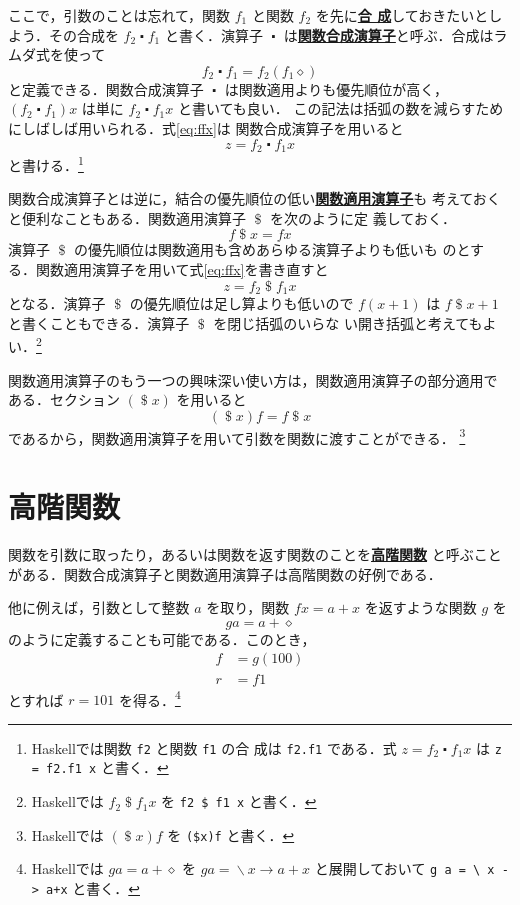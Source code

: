 \documentclass[a5paper,twoside,fleqn]{jsbook}
\newcommand{\programminglanguage}[1]{\textsf{#1}}
\newcommand{\haskell}{\programminglanguage{Haskell}}
\newcommand{\keyword}[1]{{\underline{\textbf{#1}}}}
\newcommand{\code}[1]{\texttt{#1}}
\newcommand{\mAnonParam}{\diamond}
\DeclareMathOperator{\mApply}{\$}
\DeclareMathOperator{\mComp}{\centerdot}
\DeclareMathOperator{\mLambda}{\backslash}
\DeclareMathOperator{\mLambdaArrow}{\rightarrow}
\newcommand{\mLambdaExp}[2]{\mLambda{#1}\mLambdaArrow{#2}}
\begin{document}
ここで，引数のことは忘れて，関数 $f_1$ と関数 $f_2$ を先に\keyword{合
  成}しておきたいとしよう．その合成を $f_2\mComp f_1$ と書く．演算子
$\mComp$ は\keyword{関数合成演算子}と呼ぶ．合成はラムダ式を使って
\begin{equation}
f_2\mComp f_1=f_2(f_1\mAnonParam)
\end{equation}
と定義できる．関数合成演算子 $\mComp$ は関数適用よりも優先順位が高く，
$\left(f_2\mComp f_1\right)x$ は単に $f_2\mComp f_1x$ と書いても良い．
この記法は括弧の数を減らすためにしばしば用いられる．式\eqref{eq:ffx}は
関数合成演算子を用いると
\begin{equation}
z=f_2\mComp f_1x
\end{equation}
と書ける．\footnote{\haskell では関数 \code{f2} と関数 \code{f1} の合
  成は \code{f2.f1} である．式 $z=f_2\mComp f_1x$ は \code{z = f2.f1
    x} と書く．}

関数合成演算子とは逆に，結合の優先順位の低い\keyword{関数適用演算子}も
考えておくと便利なこともある．関数適用演算子 $\mApply$ を次のように定
義しておく．
\begin{equation}
f\mApply x=fx
\end{equation}
演算子 $\mApply$ の優先順位は関数適用も含めあらゆる演算子よりも低いも
のとする．関数適用演算子を用いて式\eqref{eq:ffx}を書き直すと
\begin{equation}
z=f_2\mApply f_1x
\end{equation}
となる．演算子 $\mApply$ の優先順位は足し算よりも低いので $f(x+1)$ は
$f\mApply x+1$ と書くこともできる．演算子 $\mApply$ を閉じ括弧のいらな
い開き括弧と考えてもよい．\footnote{\haskell では $f_2\mApply f_1x$ を
  \code{f2 \$ f1 x} と書く．}

関数適用演算子のもう一つの興味深い使い方は，関数適用演算子の部分適用で
ある．セクション $(\mApply x)$ を用いると
\begin{equation}
(\mApply x)f=f\mApply x
\end{equation}
であるから，関数適用演算子を用いて引数を関数に渡すことができる．
\footnote{\haskell では $(\mApply x)f$ を \code{(\$x)f} と書く．}

\section{高階関数}

関数を引数に取ったり，あるいは関数を返す関数のことを\keyword{高階関数}
と呼ぶことがある．関数合成演算子と関数適用演算子は高階関数の好例である．

他に例えば，引数として整数 $a$ を取り，関数 $fx=a+x$ を返すような関数
$g$ を
\begin{equation}
ga=a+\mAnonParam
\end{equation}
のように定義することも可能である．このとき，
\begin{align}
f&=g(100)\\ r&=f1
\end{align}
とすれば $r=101$ を得る．\footnote{\haskell では $ga=a+\mAnonParam$ を
  $ga=\mLambdaExp{x}{a+x}$ と展開しておいて \code{g a = \textbackslash
    x -> a+x} と書く．}
\end{document}
